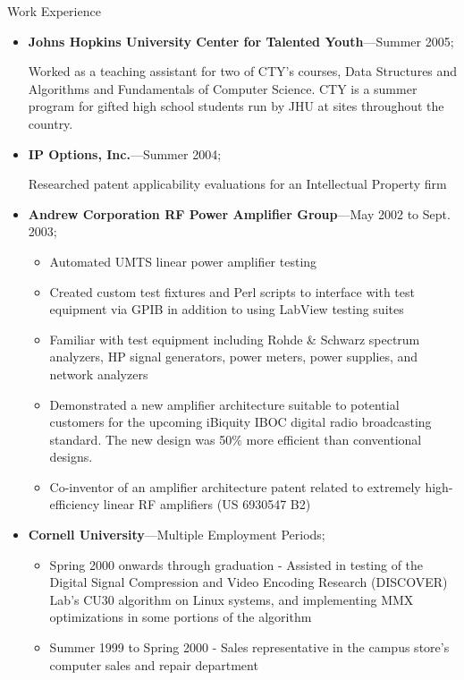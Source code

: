 \documentclass[10pt,oneside]{article}
\newenvironment{ressection}[1]{
	\vspace{4pt}
	{\Large#1}
	\begin{itemize}
	\vspace{3pt}
}{
	\end{itemize}
}
\newcommand{\ressubitem}[1]{
	\vspace{-1pt}
	\item \begin{flushleft} #1 \end{flushleft}
}
\newcommand{\resbigitem}[3]{
	\vspace{-5pt}
	\item
	\textbf{#1}---#2; \quad \textit{#3}
}
\newenvironment{ressubsec}[3]{
	\resbigitem{#1}{#2}{#3}
	\vspace{-2pt}
	\begin{itemize}
}{
	\end{itemize}
}
\newenvironment{ressection}[1]{
	\vspace{4pt}
	{\fontfamily{phv}\selectfont\Large#1}
	\begin{itemize}[leftmargin=12pt]
	\vspace{3pt}
}{
	\end{itemize}
}
\newcommand{\ressubitem}[1]{
	\vspace{-1pt}
	\item \begin{flushleft} #1 \end{flushleft}
}
\newcommand{\resbigitem}[2]{
	\vspace{-5pt}
	\item
	\textbf{#1}---\textit{#2}
}
\newenvironment{ressubsec}[2]{
	\resbigitem{#1}{#2}
	\vspace{-2pt}
	\begin{itemize}[leftmargin=12pt]
}{
	\end{itemize}
}
\begin{document}
\begin{ressection}{Work Experience}
	\begin{ressubsec}{Johns Hopkins University Center for Talented Youth}{Summer 2005}
		\ressubitem{Worked as a teaching assistant for two of CTY's courses, Data Structures and Algorithms and Fundamentals of Computer Science.  CTY is a summer program for gifted high school students run by JHU at sites throughout the country.}
	\end{ressubsec}

	\begin{ressubsec}{IP Options, Inc.}{Summer 2004}
		\ressubitem{Researched patent applicability evaluations for an Intellectual Property firm}
	\end{ressubsec}

	\begin{ressubsec}{Andrew Corporation RF Power Amplifier Group}{May 2002 to Sept. 2003}
		\ressubitem{Developed new amplifier architectures}
	        \ressubitem{Automated UMTS linear power amplifier testing}
		\ressubitem{Created custom test fixtures and Perl scripts to interface with test equipment via GPIB in addition to using LabView testing suites}
		\ressubitem{Familiar with test equipment including Rohde \& Schwarz spectrum analyzers, HP signal generators, power meters, power supplies, and network analyzers}
		\ressubitem{Demonstrated a new amplifier architecture suitable to potential customers for the upcoming iBiquity IBOC digital radio broadcasting standard. The new design was 50\% more efficient than conventional designs.}
		\ressubitem{Co-inventor of an amplifier architecture patent related to extremely high-efficiency linear RF amplifiers (US 6930547 B2)}
	\end{ressubsec}

	\begin{ressubsec}{Cornell University}{Multiple Employment Periods}
	  \ressubitem{Summer 2001 - Assisted in the design of a digital receiver for Cornell University's CUPRI radar system using the Analog Devices AD6620 digital downconverter device and a National Instruments PCI-DIO-32HS digital I/O card}
	  \ressubitem{Spring 2000 onwards through graduation - Assisted in testing of the Digital Signal Compression and Video Encoding Research (DISCOVER) Lab's CU30 algorithm on Linux systems, and implementing MMX optimizations in some portions of the algorithm}
          \ressubitem{Summer 1999 to Spring 2000 - Sales representative in the campus store's computer sales and repair department}
	\end{ressubsec}


\end{ressection}
\end{document}

